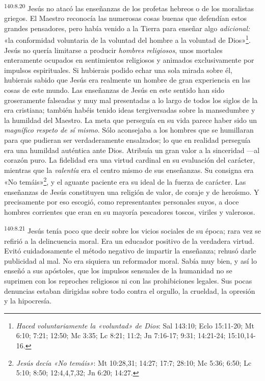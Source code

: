 \par
\textsuperscript{140:8.20} Jesús no atacó las enseñanzas de los profetas hebreos o de los moralistas griegos. El Maestro reconocía las numerosas cosas buenas que defendían estos grandes pensadores, pero había venido a la Tierra para enseñar algo \textit{adicional:} «la conformidad voluntaria de la voluntad del hombre a la voluntad de Dios»\footnote{\textit{Haced voluntariamente la «voluntad» de Dios}: Sal 143:10; Eclo 15:11-20; Mt 6:10; 7:21; 12:50; Mc 3:35; Lc 8:21; 11:2; Jn 7:16-17; 9:31; 14:21-24; 15:10,14-16.}. Jesús no quería limitarse a producir \textit{hombres religiosos}, unos mortales enteramente ocupados en sentimientos religiosos y animados exclusivamente por impulsos espirituales. Si hubierais podido echar una sola mirada sobre él, hubierais sabido que Jesús era realmente un hombre de gran experiencia en las cosas de este mundo. Las enseñanzas de Jesús en este sentido han sido groseramente falseadas y muy mal presentadas a lo largo de todos los siglos de la era cristiana; también habéis tenido ideas tergiversadas sobre la mansedumbre y la humildad del Maestro. La meta que perseguía en su vida parece haber sido un \textit{magnífico respeto de sí mismo}. Sólo aconsejaba a los hombres que se humillaran para que pudieran ser verdaderamente ensalzados; lo que en realidad perseguía era una humildad auténtica ante Dios. Atribuía un gran valor a la sinceridad ---al corazón puro. La fidelidad era una virtud cardinal en su evaluación del carácter, mientras que la \textit{valentía} era el centro mismo de sus enseñanzas. Su consigna era «No temáis»\footnote{\textit{Jesús decía «No temáis»}: Mt 10:28,31; 14:27; 17:7; 28:10; Mc 5:36; 6:50; Lc 5:10; 8:50; 12:4,4,7,32; Jn 6:20; 14:27.}, y el aguante paciente era su ideal de la fuerza de carácter. Las enseñanzas de Jesús constituyen una religión de valor, de coraje y de heroísmo. Y precisamente por eso escogió, como representantes personales suyos, a doce hombres corrientes que eran en su mayoría pescadores toscos, viriles y valerosos.

\par
\textsuperscript{140:8.21} Jesús tenía poco que decir sobre los vicios sociales de su época; rara vez se refirió a la delincuencia moral. Era un educador positivo de la verdadera virtud. Evitó cuidadosamente el método negativo de impartir la enseñanza; rehusó darle publicidad al mal. No era siquiera un reformador moral. Sabía muy bien, y así lo enseñó a sus apóstoles, que los impulsos sensuales de la humanidad no se suprimen con los reproches religiosos ni con las prohibiciones legales. Sus pocas denuncias estaban dirigidas sobre todo contra el orgullo, la crueldad, la opresión y la hipocresía.

